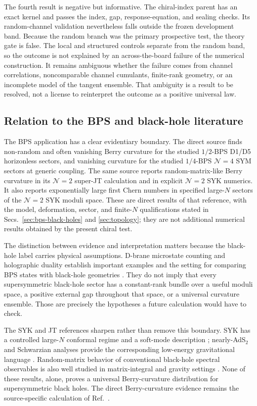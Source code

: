The fourth result is negative but informative.  The chiral-index parent has an
exact kernel and passes the index, gap, response-equation, and sealing checks.
Its random-channel validation nevertheless falls outside the frozen
development band.  Because the random branch was the primary prospective test,
the theory gate is false.  The local and structured controls separate from the
random band, so the outcome is not explained by an across-the-board failure of
the numerical construction.  It remains ambiguous whether the failure comes
from channel correlations, noncomparable channel cumulants, finite-rank
geometry, or an incomplete model of the tangent ensemble.  That ambiguity is a
result to be resolved, not a license to reinterpret the outcome as a positive
universal law.

\subsection{Relation to the BPS and black-hole literature}

The BPS application has a clear evidentiary boundary.  The direct source
\cite{chen2026berry} finds non-random and often vanishing Berry curvature for
the studied $1/2$-BPS D1/D5 horizonless sectors, and vanishing curvature for the
studied $1/4$-BPS $\mathcal{N}=4$ SYM sectors at generic coupling.  The same
source reports random-matrix-like Berry curvature in its $\mathcal{N}=2$
super-JT calculation and in explicit $\mathcal{N}=2$ SYK numerics.  It also
reports exponentially large first Chern numbers in specified large-$N$
sectors of the $\mathcal{N}=2$ SYK moduli space.  These are direct results of
that reference, with the model, deformation, sector, and finite-$N$
qualifications stated in Secs.~\ref{sec:bps-black-holes} and
\ref{sec:topology}; they are not additional numerical results obtained by the
present chiral test.

The distinction between evidence and interpretation matters because the
black-hole label carries physical assumptions.  D-brane microstate counting
and holographic duality establish important examples and the setting for
comparing BPS states with black-hole geometries
\cite{stromingervafa1996,maldacena1998ads}.  They do not imply that every
supersymmetric black-hole sector has a constant-rank bundle over a useful
moduli space, a positive external gap throughout that space, or a universal
curvature ensemble.  Those are precisely the hypotheses a future calculation
would have to check.

The SYK and JT references sharpen rather than remove this boundary.  SYK has a
controlled large-$N$ conformal regime and a soft-mode description
\cite{maldacenastanford2016,fu2017susy}; nearly-AdS$_2$ and Schwarzian analyses
provide the corresponding low-energy gravitational language
\cite{maldacenastanfordyang2016,stanfordwitten2017,mertens2017schwarzian}.
Random-matrix behavior of conventional black-hole spectral observables is also
well studied in matrix-integral and gravity settings
\cite{cotler2017rmt,saad2019jt}.  None of these results, alone, proves a
universal Berry-curvature distribution for supersymmetric black holes.  The
direct Berry-curvature evidence remains the source-specific calculation of
Ref.~\cite{chen2026berry}.

